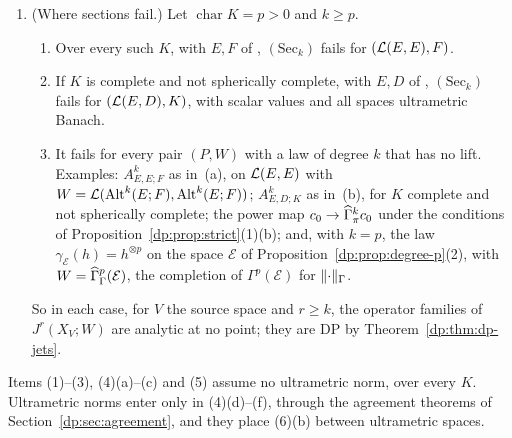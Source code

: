 \begin{theorem}
\begin{enumerate}
\item \textup{(Where sections fail.)} Let $\operatorname{char}K=p>0$ and $k\ge p$.
\begin{enumerate}
\item Over every such $K$, with $E,F$ of \cite[Theorem~7.2(1)]{I}, $(\mathrm{Sec}_k)$ fails for $(\mathcal L(E,E),F)$.
\item If $K$ is complete and not spherically complete, with $E,D$ of \cite[Theorem~7.2(2)]{I}, $(\mathrm{Sec}_k)$ fails for $(\mathcal L(E,D),K)$, with scalar values and all spaces ultrametric Banach.
\item It fails for every pair $(P,W)$ with a law of degree $k$ that has no lift. Examples: $A^k_{E,E;F}$ as in~\textup{(a)}, on $\mathcal L(E,E)$ with $W=\mathcal L(\operatorname{Alt}^k(E;F),\operatorname{Alt}^k(E;F))$; $A^k_{E,D;K}$ as in~\textup{(b)}, for $K$ complete and not spherically complete; the power map $c_0\to\widehat\Gamma^k_\pi c_0$ under the conditions of Proposition~\ref{dp:prop:strict}\textup{(1)(b)}; and, with $k=p$, the law $\gamma_{\mathcal E}(h)=h^{\otimes p}$ on the space $\mathcal E$ of Proposition~\ref{dp:prop:degree-p}\textup{(2)}, with $W=\widehat\Gamma^p_\Gamma(\mathcal E)$, the completion of $\Gamma^p(\mathcal E)$ for $\lVert \cdot\rVert_\Gamma$.
\end{enumerate}
So in each case, for $V$ the source space and $r\ge k$, the operator families of $J^r(X_V;W)$ are analytic at no point; they are DP by Theorem~\ref{dp:thm:dp-jets}.
\end{enumerate}
\end{theorem}

Items (1)--(3), (4)(a)--(c) and (5) assume no ultrametric norm, over every $K$. Ultrametric norms enter only in (4)(d)--(f), through the agreement theorems of Section~\ref{dp:sec:agreement}, and they place (6)(b) between ultrametric spaces.

